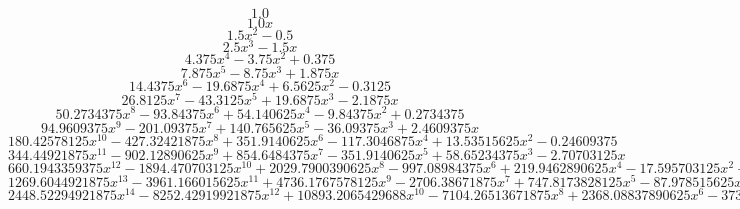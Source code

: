 \documentclass{article}
\begin{document}
\begin{equation}
1.0
\end{equation}
\begin{equation}
1.0 x
\end{equation}
\begin{equation}
1.5 x^{2} - 0.5
\end{equation}
\begin{equation}
2.5 x^{3} - 1.5 x
\end{equation}
\begin{equation}
4.375 x^{4} - 3.75 x^{2} + 0.375
\end{equation}
\begin{equation}
7.875 x^{5} - 8.75 x^{3} + 1.875 x
\end{equation}
\begin{equation}
14.4375 x^{6} - 19.6875 x^{4} + 6.5625 x^{2} - 0.3125
\end{equation}
\begin{equation}
26.8125 x^{7} - 43.3125 x^{5} + 19.6875 x^{3} - 2.1875 x
\end{equation}
\begin{equation}
50.2734375 x^{8} - 93.84375 x^{6} + 54.140625 x^{4} - 9.84375 x^{2} + 0.2734375
\end{equation}
\begin{equation}
94.9609375 x^{9} - 201.09375 x^{7} + 140.765625 x^{5} - 36.09375 x^{3} + 2.4609375 x
\end{equation}
\begin{equation}
180.42578125 x^{10} - 427.32421875 x^{8} + 351.9140625 x^{6} - 117.3046875 x^{4} + 13.53515625 x^{2} - 0.24609375
\end{equation}
\begin{equation}
344.44921875 x^{11} - 902.12890625 x^{9} + 854.6484375 x^{7} - 351.9140625 x^{5} + 58.65234375 x^{3} - 2.70703125 x
\end{equation}
\begin{equation}
660.1943359375 x^{12} - 1894.470703125 x^{10} + 2029.7900390625 x^{8} - 997.08984375 x^{6} + 219.9462890625 x^{4} - 17.595703125 x^{2} + 0.2255859375
\end{equation}
\begin{equation}
1269.6044921875 x^{13} - 3961.166015625 x^{11} + 4736.1767578125 x^{9} - 2706.38671875 x^{7} + 747.8173828125 x^{5} - 87.978515625 x^{3} + 2.9326171875 x
\end{equation}
\begin{equation}
2448.52294921875 x^{14} - 8252.42919921875 x^{12} + 10893.2065429688 x^{10} - 7104.26513671875 x^{8} + 2368.08837890625 x^{6} - 373.90869140625 x^{4} + 21.99462890625 x^{2} - 0.20947265625
\end{equation}
\end{document}
